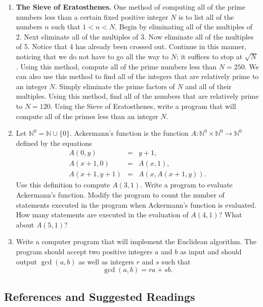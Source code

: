 {\small
\begin{enumerate}
 
\item
{\bf The Sieve of Eratosthenes.}  
One method of computing all of the prime numbers less than a certain fixed positive integer $N$ is to list all of the numbers $n$ such that $1 < n < N$.  Begin by eliminating all of the multiples of 2.  Next eliminate all of the multiples of 3. Now eliminate all of the  multiples of 5.  Notice that 4 has already been crossed out.  Continue in this manner, noticing that we do not have to go all the way to $N$; it suffices to stop at $\sqrt{N}$.  Using this method, compute all of the prime numbers less than $N = 250$.  We can also use this method to find all of the integers that are relatively prime to an integer $N$.  Simply eliminate the prime factors of $N$ and all of their multiples.  Using this method, find all of the numbers that are relatively prime to $N= 120$.  Using the Sieve of Eratosthenes, write a program that will compute all of the primes less than an integer $N$. 

\item
Let ${\mathbb N}^0 = {\mathbb N} \cup \{ 0 \}$. Ackermann's function is the function $A :{\mathbb N}^0 \times {\mathbb N}^0 \rightarrow {\mathbb N}^0$ defined by the equations 
\begin{eqnarray*}
A(0, y) & = & y + 1, \\
A(x + 1, 0) & = & A(x, 1), \\
A(x + 1, y + 1) & = & A(x, A(x + 1, y)).
\end{eqnarray*}
Use this definition to compute $A(3, 1)$.  Write a program to evaluate Ackermann's function.  Modify the  program to count the number of statements executed in the program when Ackermann's function is evaluated.  How many statements are executed in the evaluation of $A(4, 1)$?  What about $A(5, 1)$?

\item
Write a computer program that will implement the Euclidean algorithm.  The program should accept two positive integers $a$ and $b$ as input and should output $\gcd( a,b)$ as well as integers $r$ and $s$ such that 
\[
\gcd( a,b) = ra + sb.
\]
 
\end{enumerate}
}
 
 
\subsection*{References and Suggested Readings} %

